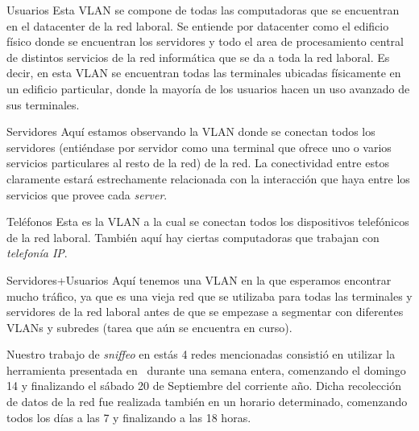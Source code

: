     \begin{LaTeXdescription}
        \item[Usuarios\label{itm:vlan10}]
            Esta VLAN se compone de todas las computadoras que se
            encuentran en el datacenter de la red laboral. Se entiende por
            datacenter como el edificio f\'isico donde se encuentran los servidores
            y todo el area de procesamiento central de distintos servicios de la
            red inform\'atica que se da a toda la red laboral. Es decir, en esta
            VLAN se encuentran todas las terminales ubicadas f\'isicamente en un
            edificio particular, donde la mayor\'ia de los usuarios hacen un uso
            avanzado de sus terminales.\\
            
        \item[Servidores\label{itm:vlan20}]
            Aqu\'i estamos observando la VLAN donde se conectan todos
            los servidores (enti\'endase por servidor como una terminal que ofrece
            uno o varios servicios particulares al resto de la red) de la red. La
            conectividad entre estos claramente estar\'a estrechamente relacionada
            con la interacci\'on que haya entre los servicios que provee cada
            \textit{server}.\\
            
        \item[Tel\'efonos\label{itm:vlan40}]
            Esta es la VLAN a la cual se conectan todos los
            dispositivos telef\'onicos de la red laboral. Tambi\'en aqu\'i hay
            ciertas computadoras que trabajan con \textit{telefon\'ia IP}.\\
            
        \item[Servidores+Usuarios\label{itm:vlan1}]
            Aqu\'i tenemos una VLAN en la que
            esperamos encontrar mucho tr\'afico, ya que es una vieja red que se
            utilizaba para todas las terminales y servidores de la red laboral antes
            de que se empezase a segmentar con diferentes VLANs y subredes (tarea que
            a\'un se encuentra en curso).\\
            
    \end{LaTeXdescription}

    \par Nuestro trabajo de \textit{sniffeo} en est\'as 4 redes mencionadas consisti\'o
    en utilizar la herramienta presentada en~ durante una semana entera,
    comenzando el domingo 14 y finalizando el s\'abado 20 de Septiembre del corriente a\~no.
    Dicha recolecci\'on de datos de la red fue realizada tambi\'en en un horario determinado,
    comenzando todos los d\'ias a las 7 y finalizando a las 18 horas.

